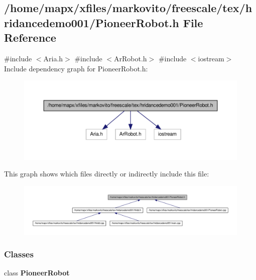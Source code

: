 \subsection{/home/mapx/xfiles/markovito/freescale/tex/hridancedemo001/\-Pioneer\-Robot.h \-File \-Reference}
\label{_pioneer_robot_8h}
{\ttfamily \#include $<$\-Aria.\-h$>$}\*
{\ttfamily \#include $<$\-Ar\-Robot.\-h$>$}\*
{\ttfamily \#include $<$iostream$>$}\*
\-Include dependency graph for \-Pioneer\-Robot.\-h\-:\nopagebreak
\begin{figure}[H]
\begin{center}
\leavevmode
\includegraphics[width=350pt]{_pioneer_robot_8h__incl}
\end{center}
\end{figure}
\-This graph shows which files directly or indirectly include this file\-:\nopagebreak
\begin{figure}[H]
\begin{center}
\leavevmode
\includegraphics[width=350pt]{_pioneer_robot_8h__dep__incl}
\end{center}
\end{figure}
\subsubsection*{\-Classes}
\begin{DoxyCompactItemize}
\item 
class {\bf \-Pioneer\-Robot}
\end{DoxyCompactItemize}
